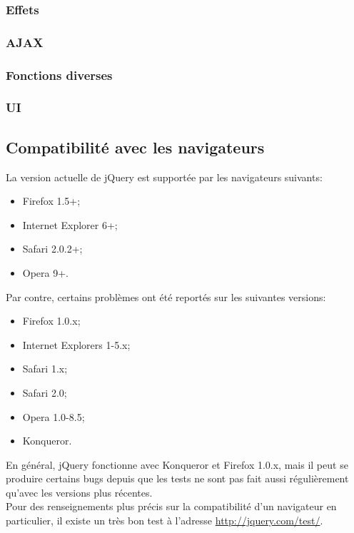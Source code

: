 \documentclass[10pt,a4paper,titlepage]{article}
\begin{document}
\subsubsection{Effets}
\subsubsection{AJAX}
\subsubsection{Fonctions diverses}
\subsubsection{UI}

\subsection{Compatibilité avec les navigateurs}
La version actuelle de jQuery est supportée par les navigateurs suivants:

\begin{itemize}
	\item {Firefox 1.5+;}
	\item {Internet Explorer 6+;}
	\item {Safari 2.0.2+;}
	\item {Opera 9+.\\}
\end{itemize}

Par contre, certains problèmes ont été reportés sur les suivantes versions:
\begin{itemize}
	\item {Firefox 1.0.x;}
	\item {Internet Explorers 1-5.x;}
	\item {Safari 1.x;}
	\item {Safari 2.0;}
	\item {Opera 1.0-8.5;}
	\item {Konqueror.\\}
\end{itemize}

En général, jQuery fonctionne avec Konqueror et Firefox 1.0.x, mais il peut se produire certains bugs depuis que les tests ne sont pas fait aussi régulièrement qu'avec les versions plus récentes.\\

Pour des renseignements plus précis sur la compatibilité d'un navigateur en particulier, il existe un très bon test à l'adresse \url{http://jquery.com/test/}.
\end{document}
